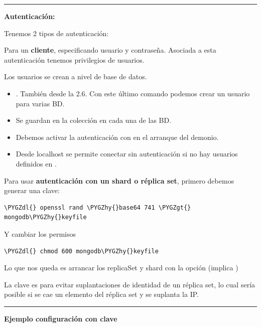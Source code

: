 \documentclass[a4paper,10pt,english]{sphinxmanual}
\def\PYGZgt{\char`\>}
\def\PYGZdl{\char`\$}
\def\PYGZhy{\char`\-}
\begin{document}
\bigskip\hrule{}\bigskip


\textbf{Autenticación:}

Tenemos 2 tipos de autenticación:

Para un \textbf{cliente}, especificando usuario y contraseña. Asociada a esta autenticación tenemos privilegios de usuarios.

Los usuarios se crean a nivel de base de datos.
\begin{itemize}
\item {} 
. También  desde la 2.6. Con este último comando podemos crear un usuario para varias BD.

\item {} 
Se guardan en la colección  en cada una de las BD.

\item {} 
Debemos activar la autenticación con  en el arranque del demonio.

\item {} 
Desde localhost se permite conectar sin autenticación si no hay usuarios definidos en .

\end{itemize}

Para usar \textbf{autenticación con un shard o réplica set}, primero debemos generar una clave:

\begin{Verbatim}[commandchars=\\\{\}]
\PYGZdl{} openssl rand \PYGZhy{}base64 741 \PYGZgt{} mongodb\PYGZhy{}keyfile
\end{Verbatim}

Y cambiar los permisos

\begin{Verbatim}[commandchars=\\\{\}]
\PYGZdl{} chmod 600 mongodb\PYGZhy{}keyfile
\end{Verbatim}

Lo que nos queda es arrancar los replicaSet y shard con la opción  (implica )

La clave es para evitar suplantaciones de identidad de un réplica set, lo cual sería posible si se cae un elemento del réplica set y se suplanta la IP.


\bigskip\hrule{}\bigskip


\textbf{Ejemplo configuración con clave}
\end{document}
